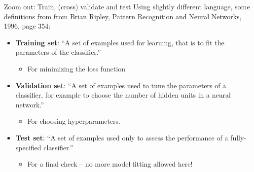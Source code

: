 \documentclass[mathserif, aspectratio=169]{beamer}
\begin{document}
\begin{frame}{Zoom out: Train, (cross) validate and test}
	Using slightly different language, some definitions from from Brian Ripley, Pattern Recognition and Neural Networks, 1996, page 354:
	\vspace{5mm}
	\begin{itemize} 
		\item \textbf{Training set}: ``A set of examples used for learning, that is to fit the parameters of the classifier.''
		\begin{itemize}
			\item{For minimizing the loss function}
		\end{itemize}
		\item\textbf{ Validation set}: ``A set of examples used to tune the parameters of a classifier, for example to choose the number of hidden units in a neural network.''
		\begin{itemize}
			\item For choosing hyperparameters.
		\end{itemize}
		\item \textbf{Test set}: ``A set of examples used only to assess the performance of a fully-specified classifier.''
		\begin{itemize}
			\item For a final check -- no more model fitting allowed here!
		\end{itemize}
	\end{itemize}
	\vspace{5mm}
\end{frame}
\end{document}
